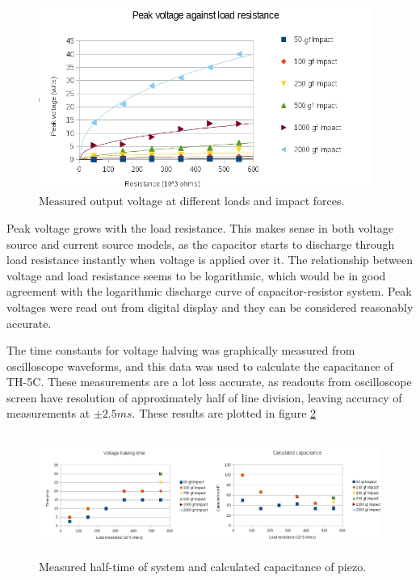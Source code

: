\begin{figure}[htb]
  \begin{center}
  \includegraphics[height=6cm]{images/own_measurement/piezo_measurements}
  \end{center}
  \caption{Measured output voltage at different loads and impact forces.}
  \label{fiq:piezo_measurement_chart}
\end{figure}

Peak voltage grows with the load resistance. This makes sense in both voltage source and current source models, as the capacitor starts to discharge through load resistance instantly when voltage is applied over it. The relationship between voltage and load resistance seems to be logarithmic, which would be in good agreement with the logarithmic discharge curve of capacitor-resistor system. Peak voltages were read out from digital display and they can be considered reasonably accurate.

The time constants for voltage halving was graphically measured from oscilloscope waveforms, and this data was used to calculate the capacitance of TH-5C. These measurements are a lot less accurate, as readouts from oscilloscope screen have resolution of approximately half of line division, leaving accuracy of measurements at $\pm 2.5 ms$. These results are plotted in figure \ref{fig:piezo_time_capacitance}

\begin{figure}[htb]
  \begin{center}
  \includegraphics[height=4cm]{images/own_measurement/piezo_capacitance}
  \end{center}
  \caption{Measured half-time of system and calculated capacitance of piezo.}
  \label{fig:piezo_time_capacitance}
\end{figure}

